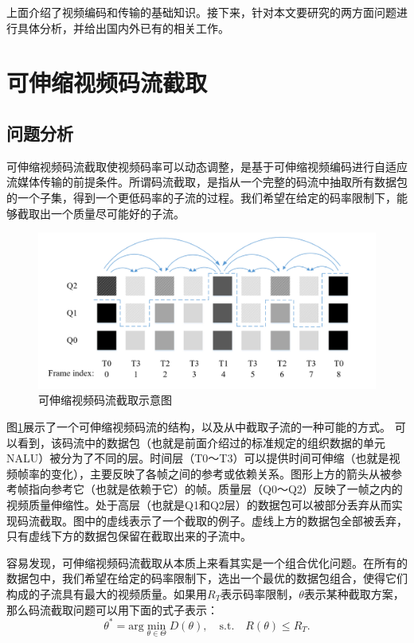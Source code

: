 上面介绍了视频编码和传输的基础知识。接下来，针对本文要研究的两方面问题进行具体分析，并给出国内外已有的相关工作。

\section{可伸缩视频码流截取}

\subsection{问题分析}

可伸缩视频码流截取使视频码率可以动态调整，是基于可伸缩视频编码进行自适应流媒体传输的前提条件。所谓码流截取，是指从一个完整的码流中抽取所有数据包的一个子集，得到一个更低码率的子流的过程。我们希望在给定的码率限制下，能够截取出一个质量尽可能好的子流。

\begin{figure}[h]
	\centering
	\includegraphics[width = 1.0\linewidth]{figures/bitstream-extraction.jpg}
	\caption{可伸缩视频码流截取示意图\label{fig:bitstream-extraction}}
\end{figure}

图\ref{fig:bitstream-extraction}展示了一个可伸缩视频码流的结构，以及从中截取子流的一种可能的方式。
可以看到，该码流中的数据包（也就是前面介绍过的标准规定的组织数据的单元NALU）被分为了不同的层。时间层（T0～T3）可以提供时间可伸缩（也就是视频帧率的变化），主要反映了各帧之间的参考或依赖关系。图形上方的箭头从被参考帧指向参考它（也就是依赖于它）的帧。质量层（Q0～Q2）反映了一帧之内的视频质量伸缩性。处于高层（也就是Q1和Q2层）的数据包可以被部分丢弃从而实现码流截取。图中的虚线表示了一个截取的例子。虚线上方的数据包全部被丢弃，只有虚线下方的数据包保留在截取出来的子流中。

容易发现，可伸缩视频码流截取从本质上来看其实是一个组合优化问题。在所有的数据包中，我们希望在给定的码率限制下，选出一个最优的数据包组合，使得它们构成的子流具有最大的视频质量。如果用$R_T$表示码率限制，$\theta$表示某种截取方案，那么码流截取问题可以用下面的式子表示：
\begin{equation}
{\theta}^* = \mathrm{arg} \min \limits_{\theta \in \Theta} D(\theta), \quad  \mathrm{s.t. } \quad R(\theta) \le R_T.
\end{equation}

